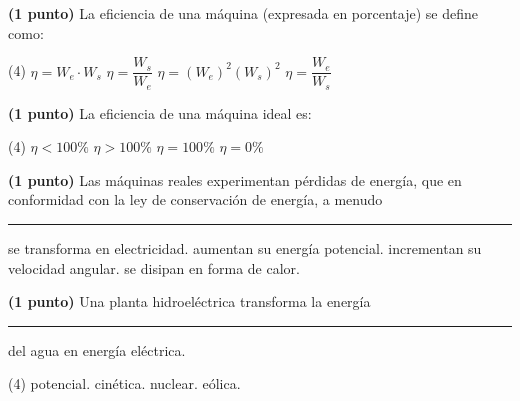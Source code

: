 \documentclass[12pt, letter]{exam}
\begin{document}
\begin{questions}
    \question \textbf{(1 punto)} La eficiencia de una máquina (expresada en porcentaje) se define como:
    \begin{tasks}(4)
        \task $\eta = W_{e} \cdot W_{s}$
        \task $\eta = \dfrac{W_{s}}{W_{e}}$
        \task $\eta = (W_{e})^2 (W_{s})^2$
        \task $\eta = \dfrac{W_{e}}{W_{s}}$
    \end{tasks}
    \question \textbf{(1 punto)} La eficiencia de una máquina ideal es:
    \begin{tasks}(4)
        \task $\eta < 100 \%$
        \task $\eta > 100 \%$
        \task $\eta = 100 \%$
        \task $\eta = 0 \%$
    \end{tasks}
    \question \textbf{(1 punto)} Las máquinas reales experimentan pérdidas de energía, que en conformidad con la ley de conservación de energía, a menudo \rule{2cm}{0.1mm}
    \begin{multicols}{2}
    \begin{tasks}
        \task se transforma en electricidad.
        \task aumentan su energía potencial.
        \task incrementan su velocidad angular.
        \task se disipan en forma de calor.
    \end{tasks}
    \end{multicols}
    \question \textbf{(1 punto)} Una planta hidroeléctrica transforma la energía \rule{2cm}{0.1mm} del agua en energía eléctrica.
    \begin{tasks}(4)
        \task potencial.
        \task cinética.
        \task nuclear.
        \task eólica.
    \end{tasks}
\end{questions}

\vspace{1cm}
\end{document}

